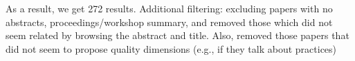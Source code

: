 As a result, we get 272 results. Additional filtering: excluding papers with no abstracts, proceedings/workshop summary, and removed those which did not seem related by browsing the abstract and title. Also, removed those papers that did not seem to propose quality dimensions (e.g., if they talk about practices)



